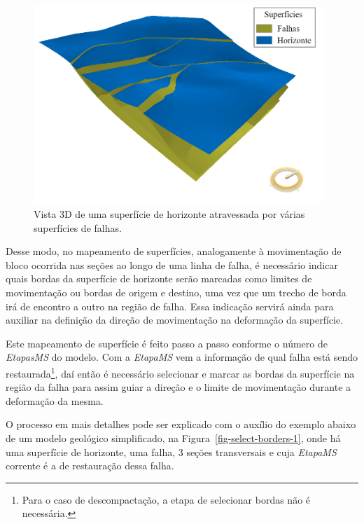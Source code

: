 \begin{figure} [H]
  \begin{center}
    \includegraphics[width=310pt]{images/fig-surfaces-horizon-faults}
    \caption{Vista 3D de uma superfície de horizonte atravessada por várias superfícies de falhas.}\label{fig-surfaces-horizon-faults}
  \end{center}
\end{figure}

Desse modo, no mapeamento de superfícies, analogamente à movimentação de bloco ocorrida nas seções ao longo de uma linha de falha, é necessário indicar quais bordas da superfície de horizonte serão marcadas como limites de movimentação ou bordas de origem e destino, uma vez que um trecho de borda irá de encontro a outro na região de falha. Essa indicação servirá ainda para auxiliar na definição da direção de movimentação na deformação da superfície.

Este mapeamento de superfície é feito passo a passo conforme o número de \textit{EtapasMS} do modelo. Com a \textit{EtapaMS} vem a informação de qual falha está sendo restaurada\footnote{Para o caso de descompactação, a etapa de selecionar bordas não é necessária.}, daí então é necessário selecionar e marcar as bordas da superfície na região da falha para assim guiar a direção e o limite de movimentação durante a deformação da mesma.

O processo em mais detalhes pode ser explicado com o auxílio do exemplo abaixo de um modelo geológico simplificado, na Figura~\ref{fig-select-borders-1}, onde há uma superfície de horizonte, uma falha, 3 seções transversais e cuja \textit{EtapaMS} corrente é a de restauração dessa falha.

